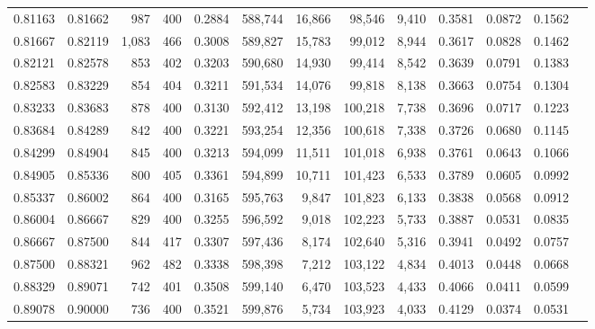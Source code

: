 \begin{tabular}{rrrrrrrrrrrrr}
0.81163 & 0.81662 &    987 &   400 &                                     0.2884 & 588,744 &  16,866 &  98,546 &   9,410 & 0.3581 & 0.0872 & 0.1562 \\
0.81667 & 0.82119 &  1,083 &   466 &                                     0.3008 & 589,827 &  15,783 &  99,012 &   8,944 & 0.3617 & 0.0828 & 0.1462 \\
0.82121 & 0.82578 &    853 &   402 &                                     0.3203 & 590,680 &  14,930 &  99,414 &   8,542 & 0.3639 & 0.0791 & 0.1383 \\
0.82583 & 0.83229 &    854 &   404 &                                     0.3211 & 591,534 &  14,076 &  99,818 &   8,138 & 0.3663 & 0.0754 & 0.1304 \\
0.83233 & 0.83683 &    878 &   400 &                                     0.3130 & 592,412 &  13,198 & 100,218 &   7,738 & 0.3696 & 0.0717 & 0.1223 \\
0.83684 & 0.84289 &    842 &   400 &                                     0.3221 & 593,254 &  12,356 & 100,618 &   7,338 & 0.3726 & 0.0680 & 0.1145 \\
0.84299 & 0.84904 &    845 &   400 &                                     0.3213 & 594,099 &  11,511 & 101,018 &   6,938 & 0.3761 & 0.0643 & 0.1066 \\
0.84905 & 0.85336 &    800 &   405 &                                     0.3361 & 594,899 &  10,711 & 101,423 &   6,533 & 0.3789 & 0.0605 & 0.0992 \\
0.85337 & 0.86002 &    864 &   400 &                                     0.3165 & 595,763 &   9,847 & 101,823 &   6,133 & 0.3838 & 0.0568 & 0.0912 \\
0.86004 & 0.86667 &    829 &   400 &                                     0.3255 & 596,592 &   9,018 & 102,223 &   5,733 & 0.3887 & 0.0531 & 0.0835 \\
0.86667 & 0.87500 &    844 &   417 &                                     0.3307 & 597,436 &   8,174 & 102,640 &   5,316 & 0.3941 & 0.0492 & 0.0757 \\
0.87500 & 0.88321 &    962 &   482 &                                     0.3338 & 598,398 &   7,212 & 103,122 &   4,834 & 0.4013 & 0.0448 & 0.0668 \\
0.88329 & 0.89071 &    742 &   401 &                                     0.3508 & 599,140 &   6,470 & 103,523 &   4,433 & 0.4066 & 0.0411 & 0.0599 \\
0.89078 & 0.90000 &    736 &   400 &                                     0.3521 & 599,876 &   5,734 & 103,923 &   4,033 & 0.4129 & 0.0374 & 0.0531 \\

\end{tabular}
